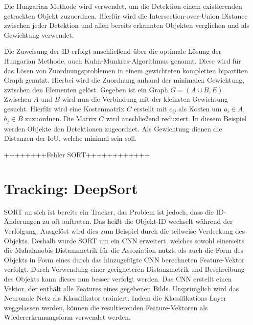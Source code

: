 \documentclass[conference]{IEEEtran}
\begin{document}
	Die Hungarian Methode wird verwendet, um die Detektion einem existierenden getrackten Objekt zuzuordnen. Hierfür wird die Intersection-over-Union Distance zwischen jeder Detektion und allen bereits erkannten Objekten verglichen und als Gewichtung verwendet.
	
	Die Zuweisung der ID erfolgt anschließend über die optimale Lösung der Hungarian Methode, auch Kuhn-Munkres-Algorithmus genannt. Diese wird für das Lösen von Zuordnungsproblemen in einem gewichteten kompletten bipartiten Graph genutzt. Hierbei wird die Zuordnung anhand der minimalen Gewichtung, zwischen den Elementen gelöst. Gegeben ist ein Graph $G = (A \cup B, E) $. Zwischen $A$ und $B$ wird nun die Verbindung mit der kleinsten Gewichtung gesucht. Hierfür wird eine Kostenmatrix $C$ erstellt mit $c_{ij}$ als Kosten um $a_i \in A$, $b_j \in B$ zuzuordnen. Die Matrix $C$ wird anschließend reduziert. In diesem Beispiel werden Objekte den Detektionen zugeordnet. Als Gewichtung dienen die Distanzen der IoU, welche minimal sein soll.
	 
	 ++++++++Fehler SORT++++++++++++
	 
	\section{Tracking: DeepSort}
	
	SORT an sich ist bereits ein Tracker, das Problem ist jedoch, dass die ID-Änderungen zu oft auftreten. Das heißt die Objekt-ID wechselt während der Verfolgung. Ausgelöst wird dies zum Beispiel durch die teilweise Verdeckung des Objekts. Deshalb wurde SORT um ein CNN erweitert, welches sowohl einerseits die Mahalanobis-Distanzmetrik für die Assoziation nutzt, als auch die Form des Objekts in Form eines durch das hinzugefügte CNN berechneten Feature-Vektor verfolgt. Durch Verwendung einer geeigneteren Distanzmetrik und Beschreibung des Objekts kann dieses nun besser verfolgt werden.
	Das CNN erstellt einen Vektor, der enthält alle Features eines gegebenen Bilds. Ursprünglich wird das Neuronale Netz als Klassifikator trainiert. Indem die Klassifikations Layer weggelassen werden, können die resultierenden Feature-Vektoren als Wiedererkennungsform verwendet werden.
	
\end{document}
